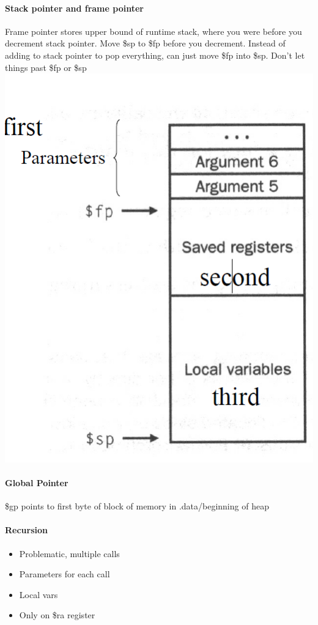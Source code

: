 \documentclass[12 pt]{article}
\begin{document}
\paragraph{Stack pointer and frame pointer}Frame pointer stores upper bound of runtime stack, where you were before you decrement stack pointer. Move \$sp to \$fp before you decrement. Instead of adding to stack pointer to pop everything, can just move \$fp into \$sp. Don't let things past \$fp or \$sp
\\ \includegraphics[scale=0.7]{fpsp}
\paragraph{Global Pointer} \$gp points to first byte of block of memory in .data/beginning of heap 
\paragraph{Recursion}
\begin{itemize}
\item Problematic, multiple calls
\item Parameters for each call
\item Local vars
\item Only on \$ra register
\end{itemize}
\end{document}
